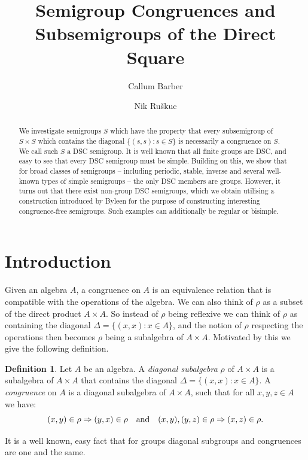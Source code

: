 \documentclass[a4paper, 12pt,reqno]{amsart}
\title{Semigroup Congruences and Subsemigroups of the Direct Square}
\author[C.\ Barber]{Callum Barber}
\author[N.\ Ru\v{s}kuc]{Nik Ru\v{s}kuc}
\theoremstyle{plain}
\theoremstyle{definition}
\newtheorem{definition}[thm]{Definition}
\theoremstyle{remark}
\begin{document}
\maketitle

\begin{abstract}
We investigate semigroups $S$ which have the property that every subsemigroup of $S\times S$ which contains the diagonal $\{ (s,s)\colon s\in S\}$ is necessarily a congruence on $S$. 
We call such $S$  a  DSC semigroup.
It is well known that all finite groups are DSC, and easy to see that every DSC semigroup must be simple. Building on this, we show that for broad classes of semigroups -- including periodic, stable, inverse and several well-known types of simple semigroups -- the only DSC members are groups. However, it turns out that there exist non-group DSC semigroups, which we obtain utilising a construction introduced by Byleen for the purpose of constructing interesting congruence-free semigroups. Such examples can additionally be regular or bisimple.
\end{abstract}




\section{Introduction}

Given an algebra $A$, a congruence on $A$ is an equivalence relation that is compatible with the operations of the algebra. 
We can also think of $\rho$ as a subset of the direct product $A \times A$.
So instead of $\rho$ being reflexive we can think of $\rho$ as containing the diagonal $\Delta = \{(x,x) \colon  x \in A \}$, and the notion of $\rho$ respecting the operations then becomes $\rho$ being a subalgebra of $A \times A$. 
Motivated by this we give the following definition.

\begin{definition}
    Let $A$ be an algebra. A \textit{diagonal subalgebra} $\rho$ of $A \times A$ is a subalgebra of $A \times A$ that contains the diagonal $\Delta = \{(x,x) \colon  x \in A \}$. A \textit{congruence} on $A$ is a diagonal subalgebra of $A \times A$, such that for all $x,y,z \in A$ we have:
\[
        (x,y) \in \rho \Rightarrow (y,x) \in \rho \quad\textup{and}\quad (x,y),(y,z) \in \rho \Rightarrow (x,z) \in \rho.
\]
\end{definition}

It is a well known, easy fact that for groups diagonal subgroups and congruences are one and the same.
\end{document}
